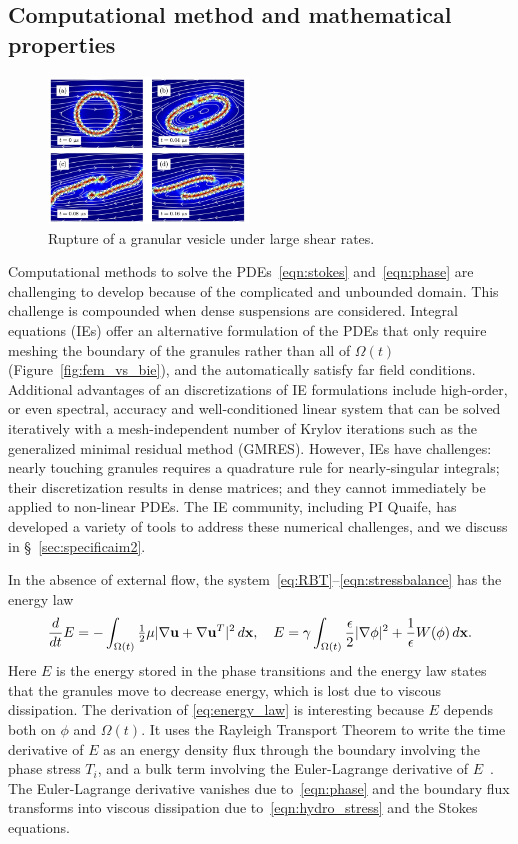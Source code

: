 \subsection{Computational method and mathematical properties}
\begin{figure}
\includegraphics[width=0.475\textwidth]{figures/PreliminaryWork/Rupture.jpg}
\caption{\label{fig:JPv_rupture}Rupture of a granular vesicle under large shear rates.}
\end{figure}
Computational methods to solve the PDEs~\eqref{eqn:stokes}
and~\eqref{eqn:phase} are challenging to develop because of
the complicated and unbounded domain.
This challenge is compounded when dense
suspensions are considered. Integral equations (IEs) offer an
alternative formulation of the PDEs that only require meshing the
boundary of the granules rather than all of $\Omega(t)$
(Figure~\ref{fig:fem_vs_bie}), and the automatically satisfy far field
conditions. Additional advantages of an discretizations of IE
formulations include high-order, or even spectral, accuracy and
well-conditioned linear system that can be solved iteratively with a
mesh-independent number of Krylov iterations such as the generalized
minimal residual method (GMRES). However, IEs have challenges: nearly
touching granules requires a quadrature rule for nearly-singular
integrals; their discretization results in dense matrices; and they
cannot immediately be applied to non-linear PDEs. The IE community,
including PI Quaife, has developed a variety of tools to address these
numerical challenges, and we discuss in \S~\ref{sec:specificaim2}.

In the absence of external flow, the
system~\eqref{eq:RBT}--\eqref{eqn:stressbalance} has the energy law
\begin{align}
\label{eq:energy_law}
  \frac{d}{dt}E
  = - \int_{\Omega(t)}\tfrac{1}{2}\mu|\nabla \mathbf{u} + \nabla
  \mathbf{u}^T|^2 \,d\mathbf{x},\quad
    E = \gamma \int_{\Omega(t)}
  \frac{\epsilon}{2} |\nabla \phi|^2 + \frac{1}{\epsilon} W(\phi) \,d\mathbf{x}.
\end{align}
Here $E$ is the energy stored in the phase transitions
and the energy law states that
the granules move to decrease energy,
which is lost due to viscous dissipation.
The derivation of \eqref{eq:energy_law} is interesting
because $E$ depends both on $\phi$
and $\Omega(t)$. It uses the Rayleigh Transport Theorem to write the time
derivative of $E$ as an energy density flux through the boundary
involving the phase stress $T_i$, and a bulk term involving the Euler-Lagrange
derivative of $E$~\cite{Fu2018_SIAM}. The Euler-Lagrange derivative vanishes due
to~\eqref{eqn:phase} and the boundary flux transforms into viscous
dissipation due to~\eqref{eqn:hydro_stress} and the Stokes equations. 

